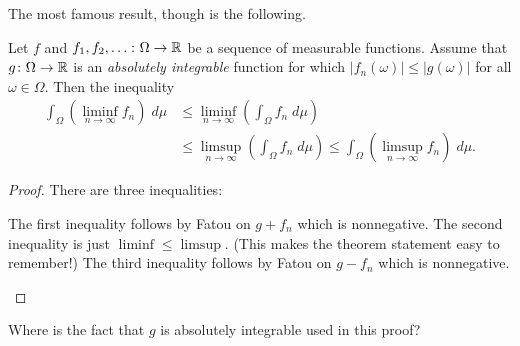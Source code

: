 The most famous result, though is the following.
\begin{corollary}
	Let $f$ and $f_1, f_2, \dots \colon \Omega \to \mathbb R$
	be a sequence of measurable functions.
	Assume that $g \colon \Omega \to \mathbb R$ is an
	\emph{absolutely integrable} function for which
	$|f_n(\omega)| \le |g(\omega)|$ for all $\omega \in \Omega$.
	Then the inequality
	\begin{align*}
		\int_\Omega \left( \liminf_{n \to \infty} f_n \right) \; d\mu
		&\le \liminf_{n \to \infty} \left( \int_\Omega f_n \; d\mu \right) \\
		&\le \limsup_{n \to \infty} \left( \int_\Omega f_n \; d\mu \right)
		\le \int_\Omega \left( \limsup_{n \to \infty} f_n \right) \; d\mu.
	\end{align*}
\end{corollary}
\begin{proof}
	There are three inequalities:
	\begin{itemize}
		\ii The first inequality follows by Fatou on $g + f_n$ which is nonnegative.
		\ii The second inequality is just $\liminf \le \limsup$.
		(This makes the theorem statement easy to remember!)
		\ii The third inequality follows by Fatou on $g - f_n$ which is nonnegative.
		\qedhere
	\end{itemize}
\end{proof}

\begin{exercise}
	Where is the fact that $g$ is absolutely integrable used in this proof?
\end{exercise}

